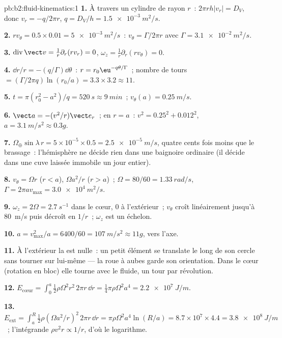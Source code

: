 \begin{solution}{pb:b2:fluid-kinematics:1}
\textbf{1.} À travers un cylindre de rayon $r$~: $2\pi rh|v_r| = D_V$, donc
$v_r = -q/2\pi r$, $q = D_V/h = \qty{1.5e-3}{m^2/s}$.

\textbf{2.} $rv_\theta = 0.5 \times 0.01 = \qty{5e-3}{m^2/s}$~: $v_\theta = \Gamma/2\pi r$
avec $\Gamma = \qty{3.1e-2}{m^2/s}$.

\textbf{3.} $\operatorname{div}\vect v = \frac1r\partial_r(rv_r) = 0$, $\omega_z =
\frac1r\partial_r(rv_\theta) = 0$.

\textbf{4.} $\dd r/r = -(q/\Gamma)\dd\theta$~: $r = r_0\eu^{-q\theta/\Gamma}$~; nombre de tours
$= (\Gamma/2\pi q)\ln(r_0/a) = 3.3 \times 3.2 \approx 11$.

\textbf{5.} $t = \pi(r_0^2 - a^2)/q = \qty{520}{s} \approx \qty{9}{min}$~; $v_\theta(a) =
\qty{0.25}{m/s}$.

\textbf{6.} $\vect a = -(v^2/r)\vect e_r$~; en $r = a$~: $v^2 = 0.25^2 + 0.012^2$,
$a = \qty{3.1}{m/s^2} \approx 0.3g$.

\textbf{7.} $\Omega_\oplus\sin\lambda\,r = 5 \times 10^{-5} \times 0.5 = \qty{2.5e-5}{m/s}$,
quatre cents fois moins que le brassage~: l'hémisphère ne décide
rien dans une baignoire ordinaire (il décide dans une cuve laissée immobile un jour entier).

\textbf{8.} $v_\theta = \Omega r$ ($r < a$), $\Omega a^2/r$ ($r > a$)~; $\Omega = 80/60
= \qty{1.33}{rad/s}$, $\Gamma = 2\pi av_{\max} = \qty{3.0e4}{m^2/s}$.

\textbf{9.} $\omega_z = 2\Omega = \qty{2.7}{s^{-1}}$ dans le cœur, $0$ à l'extérieur~;
$v_\theta$ croît linéairement jusqu'à \qty{80}{m/s} puis décroît en $1/r$~; $\omega_z$ est un
échelon.

\textbf{10.} $a = v_{\max}^2/a = 6400/60 = \qty{107}{m/s^2} \approx 11g$, vers l'axe.

\textbf{11.} À l'extérieur la  est nulle~: un petit élément se translate
le long de son cercle sans tourner sur lui-même --- la roue à aubes
garde son orientation. Dans le cœur (rotation en bloc) elle tourne avec le
fluide, un tour par révolution.

\textbf{12.} $E_{\text{cœur}} = \int_0^a\tfrac12\rho\Omega^2r^2\,2\pi r\,\dd r =
\tfrac14\pi\rho\Omega^2a^4 = \qty{2.2e7}{J/m}$.

\textbf{13.} $E_{\text{ext}} = \int_a^R\tfrac12\rho(\Omega a^2/r)^2\,2\pi r\,\dd r =
\pi\rho\Omega^2a^4\ln(R/a) = 8.7 \times 10^7 \times 4.4 = \qty{3.8e8}{J/m}$~; l'intégrande
$\rho v^2r \propto 1/r$, d'où le logarithme.


\end{solution}
